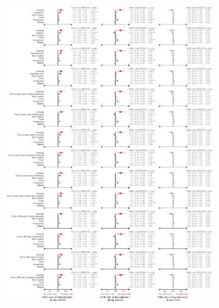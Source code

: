 \documentclass[11pt,a4paper]{article}
\begin{document}
\begin{figure}[hbtp]\ContinuedFloat
    \begin{subfigure}{\textwidth}
        \centering
        \caption{}
        \label{fig:reg-abl-hyper-full}
        \includegraphics[width=\textwidth]{figure/abl/coef_env_abl_binomial_hyper.pdf}
    \end{subfigure}
\end{figure}

\newpage


\end{document}
